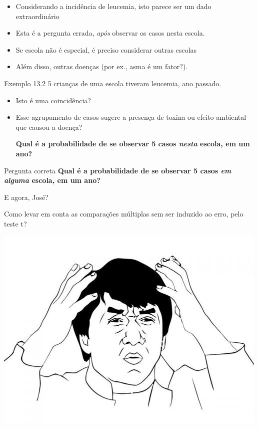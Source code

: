 \documentclass{beamer}
\begin{document}
\begin{frame}
  \begin{itemize}
  \item Considerando a incidência de leucemia, isto parece ser um dado extraordinário
  \item Esta é a pergunta errada, {\em após} observar os casos nesta escola.
  \item Se escola não é especial, é preciso considerar outras escolas
  \item Além disso, outras doenças (por ex., asma é um fator?).
  \end{itemize}

\end{frame}
\begin{frame}
  \begin{exampleblock}{Exemplo 13.2}
    5 crianças de uma escola tiveram leucemia, ano passado.

    \begin{itemize}
    \item Isto é uma coincidência?
    \item Esse agrupamento de casos sugere a presença de toxina ou efeito ambiental que causou a doença?

      \bigskip
      {\bf Qual é a probabilidade de se observar 5 casos {\em nesta} escola, em um ano?}
    \end{itemize}
  \end{exampleblock}
  \begin{exampleblock}{Pergunta correta}
    {\bf Qual é a probabilidade de se observar 5 casos {\em em alguma} escola, em um ano?}
  \end{exampleblock}
\end{frame}

\begin{frame}{E agora, José?}
  \begin{block}{}
    Como levar em conta as comparações múltiplas sem ser induzido ao erro, pelo teste t?
  \end{block}
  \bigskip
  \begin{center}
    \includegraphics[width=.4\textwidth]{Jackie-Chan-WTF}
  \end{center}
\end{frame}
\end{document}
